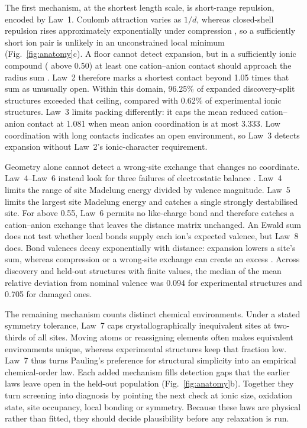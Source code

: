 The first mechanism, at the shortest length scale, is short-range repulsion, encoded by
Law~1. Coulomb attraction varies as \(1/d\), whereas closed-shell repulsion rises
approximately exponentially under compression \cite{born1932gittertheorie}, so a
sufficiently short ion pair is unlikely in an unconstrained local minimum
(Fig.~\ref{fig:anatomy}c). A floor cannot detect expansion, but in a
sufficiently ionic compound (\fion{} above 0.50) at least one cation--anion contact
should approach the radius sum \cite{hawthorne2026crystal}. Law~2 therefore marks a
shortest contact beyond 1.05 times that sum as unusually open. Within this domain, 96.25\% of
expanded discovery-split structures exceeded that ceiling, compared with 0.62\% of
experimental ionic structures. Law~3 limits packing differently: it caps the mean
reduced cation--anion contact at 1.081 when mean anion coordination is at most 3.333. Low coordination with long contacts indicates an open environment, so Law~3
detects expansion without Law~2's ionic-character requirement.

Geometry alone cannot detect a wrong-site exchange that changes no coordinate. Law~4--Law~6
instead look for three failures of electrostatic balance
\cite{ewald1921berechnung,hoppe1979effective}. Law~4 limits the range of site Madelung
energy divided by valence magnitude. Law~5 limits the largest site Madelung energy and catches a
single strongly destabilised site. For \fion{} above 0.55, Law~6 permits no like-charge
bond and therefore catches a cation--anion exchange that leaves the distance matrix
unchanged.
An Ewald sum does not test whether local bonds supply each ion's expected valence, but
Law~8 does. Bond valences decay exponentially with distance: expansion
lowers a site's sum, whereas compression or a wrong-site exchange can create an excess
\cite{brown2009recent,brese1991bond}. Across discovery and held-out structures with finite values,
the median of the mean relative deviation from nominal valence was 0.094 for experimental
structures and 0.705 for damaged ones.

The remaining mechanism counts distinct chemical environments. Under a stated symmetry
tolerance, Law~7 caps crystallographically inequivalent sites at two-thirds of all sites.
Moving atoms or reassigning elements often makes equivalent environments unique, whereas
experimental structures keep that fraction low. Law~7 thus turns Pauling's
preference for structural simplicity into an empirical chemical-order law. Each added
mechanism fills detection gaps that the earlier laws leave open in the held-out population
(Fig.~\ref{fig:anatomy}b). Together they turn screening into diagnosis by pointing the next
check at ionic size, oxidation state, site occupancy, local bonding or symmetry. Because these laws are physical rather than fitted, they should decide plausibility
before any relaxation is run.

